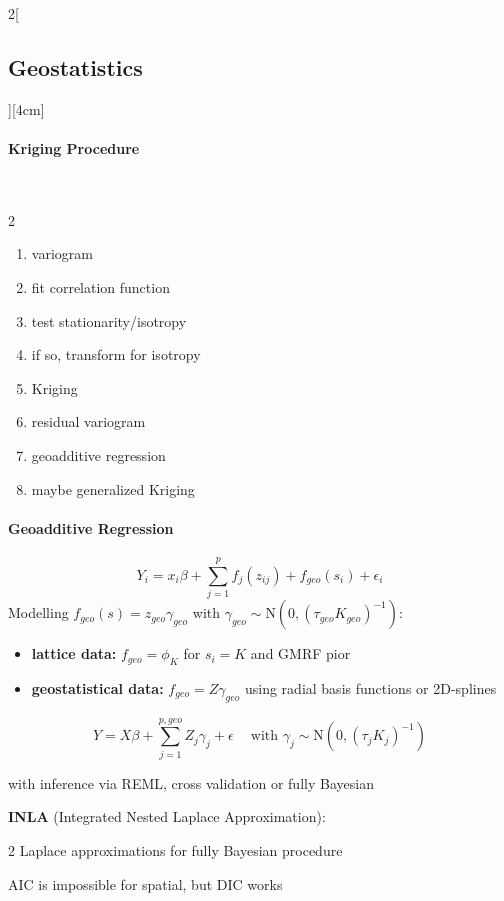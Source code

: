 \documentclass[8pt]{extarticle}
\begin{document}
\begin{multicols}{2}[\subsection{Geostatistics}][4cm]
\paragraph{Kriging Procedure} \ \\
\vspace{-2em}
\begin{multicols}{2}
\begin{enumerate}[itemsep=-0.3em]
\item variogram
\item fit correlation function
\item test stationarity/isotropy
\item if so, transform for isotropy
\item Kriging
\item residual variogram
\item geoadditive regression
\item maybe generalized Kriging
\end{enumerate}
\end{multicols}

\paragraph{Geoadditive Regression}
$$Y_i=x_i\beta + \sum_{j=1}^pf_j(z_{ij})+f_{geo}(s_i)+\epsilon_i$$
Modelling $f_{geo}(s)=z_{geo}\gamma_{geo}$ with $\gamma_{geo}\sim\mathrm{N}\left(0, (\tau_{geo}K_{geo})^{-1}\right)$:
\vspace{-0.5em}
\begin{itemize}[itemsep=-0.3em]
\item \textbf{lattice data:} $f_{geo}=\phi_K$ for $s_i=K$ and GMRF pior
\item \textbf{geostatistical data:} $f_{geo}=Z\gamma_{geo}$ using radial basis functions or 2D-splines
\end{itemize}
$$Y=X\beta + \sum_{j=1}^{p,geo}Z_j\gamma_j+\epsilon \:\:\:\: \text{  with  } \gamma_j \sim \mathrm{N}\left(0, (\tau_jK_j)^{-1}\right)$$

\noindent with inference via REML, cross validation or fully Bayesian

\textbf{INLA} (Integrated Nested Laplace Approximation):

2 Laplace approximations for fully Bayesian procedure

\noindent AIC is impossible for spatial, but DIC works

\end{multicols}
\end{document}
